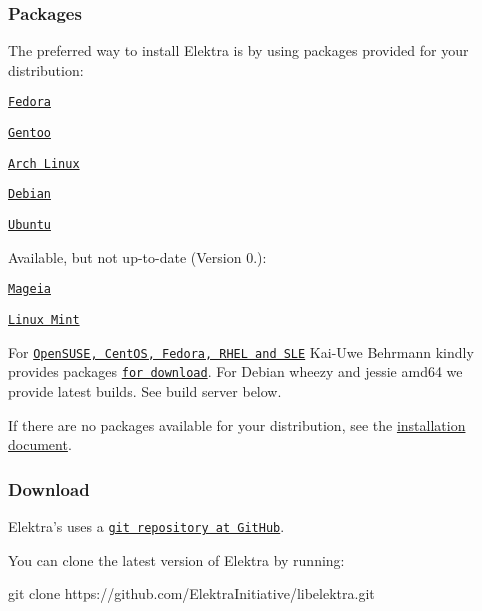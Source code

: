 \subsubsection*{Packages}

The preferred way to install Elektra is by using packages provided for your distribution\+:
\begin{DoxyItemize}
\item \href{https://admin.fedoraproject.org/pkgdb/package/elektra/}{\tt Fedora}
\item \href{http://packages.gentoo.org/package/app-admin/elektra}{\tt Gentoo}
\item \href{https://aur.archlinux.org/packages/elektra/}{\tt Arch Linux}
\item \href{https://packages.debian.org/de/jessie/libelektra4}{\tt Debian}
\item \href{https://launchpad.net/ubuntu/+source/elektra}{\tt Ubuntu}
\end{DoxyItemize}

Available, but not up-\/to-\/date (Version 0.)\+:
\begin{DoxyItemize}
\item \href{http://svnweb.mageia.org/packages/updates/1/elektra/}{\tt Mageia}
\item \href{http://community.linuxmint.com/software/view/elektra}{\tt Linux Mint}
\end{DoxyItemize}

For \href{https://build.opensuse.org/package/show/home:bekun:devel/elektra}{\tt Open\+S\+U\+S\+E, Cent\+O\+S, Fedora, R\+H\+E\+L and S\+L\+E} Kai-\/\+Uwe Behrmann kindly provides packages \href{http://software.opensuse.org/download.html?project=home%3Abekun%3Adevel&package=libelektra4}{\tt for download}. For Debian wheezy and jessie amd64 we provide latest builds. See build server below.

If there are no packages available for your distribution, see the \hyperlink{doc_INSTALL_md}{installation document}.

\subsubsection*{Download}

Elektra's uses a \href{https://github.com/ElektraInitiative/libelektra}{\tt git repository at Git\+Hub}.

You can clone the latest version of Elektra by running\+: \begin{DoxyVerb}     git clone https://github.com/ElektraInitiative/libelektra.git
\end{DoxyVerb}


